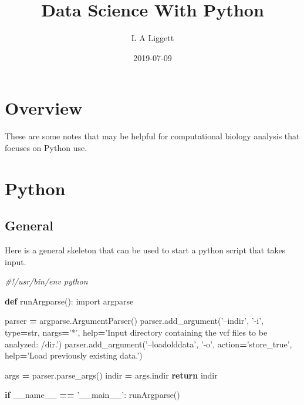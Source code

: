 \documentclass[]{book}
\title{Data Science With Python}
\author{L A Liggett}
\date{2019-07-09}
\newenvironment{Shaded}{\begin{snugshade}}{\end{snugshade}}
\newcommand{\KeywordTok}[1]{\textcolor[rgb]{0.13,0.29,0.53}{\textbf{#1}}}
\newcommand{\StringTok}[1]{\textcolor[rgb]{0.31,0.60,0.02}{#1}}
\newcommand{\ImportTok}[1]{#1}
\newcommand{\CommentTok}[1]{\textcolor[rgb]{0.56,0.35,0.01}{\textit{#1}}}
\newcommand{\VariableTok}[1]{\textcolor[rgb]{0.00,0.00,0.00}{#1}}
\newcommand{\ControlFlowTok}[1]{\textcolor[rgb]{0.13,0.29,0.53}{\textbf{#1}}}
\newcommand{\OperatorTok}[1]{\textcolor[rgb]{0.81,0.36,0.00}{\textbf{#1}}}
\newcommand{\BuiltInTok}[1]{#1}
\newcommand{\NormalTok}[1]{#1}
\begin{document}
\maketitle

{
\setcounter{tocdepth}{1}
\tableofcontents
}
\chapter{Overview}\label{overview}

These are some notes that may be helpful for computational biology
analysis that focuses on Python use.

\chapter{Python}\label{python}

\section{General}\label{general}

Here is a general skeleton that can be used to start a python script
that takes input.

\begin{Shaded}
\begin{Highlighting}[]
\CommentTok{#!/usr/bin/env python}

\KeywordTok{def}\NormalTok{ runArgparse():}
\ImportTok{import}\NormalTok{ argparse}

\NormalTok{parser }\OperatorTok{=}\NormalTok{ argparse.ArgumentParser()}
\NormalTok{parser.add_argument(}\StringTok{'--indir'}\NormalTok{, }\StringTok{'-i'}\NormalTok{, }\BuiltInTok{type}\OperatorTok{=}\BuiltInTok{str}\NormalTok{, nargs}\OperatorTok{=}\StringTok{'*'}\NormalTok{, }\BuiltInTok{help}\OperatorTok{=}\StringTok{'Input directory containing the vcf files to be analyzed: /dir.'}\NormalTok{)}
\NormalTok{parser.add_argument(}\StringTok{'--loadolddata'}\NormalTok{, }\StringTok{'-o'}\NormalTok{, action}\OperatorTok{=}\StringTok{'store_true'}\NormalTok{, }\BuiltInTok{help}\OperatorTok{=}\StringTok{'Load previously existing data.'}\NormalTok{)}

\NormalTok{args }\OperatorTok{=}\NormalTok{ parser.parse_args()}
\NormalTok{indir }\OperatorTok{=}\NormalTok{ args.indir}
\ControlFlowTok{return}\NormalTok{ indir}

\ControlFlowTok{if} \VariableTok{__name__} \OperatorTok{==} \StringTok{'__main__'}\NormalTok{:}
\NormalTok{    runArgparse()}
\end{Highlighting}
\end{Shaded}
\end{document}
